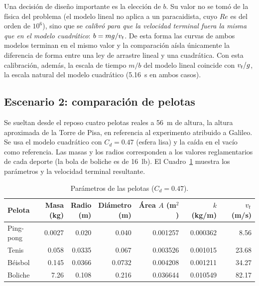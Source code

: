 Una decisión de diseño importante es la elección de $b$. Su valor no se tomó de la física del problema (el modelo lineal no aplica a un paracaidista, cuyo $Re$ es del orden de $10^6$), sino que se \emph{calibró para que la velocidad terminal fuera la misma que en el modelo cuadrático}: $b = mg/v_t$. De esta forma las curvas de ambos modelos terminan en el mismo valor y la comparación aísla únicamente la diferencia de forma entre una ley de arrastre lineal y una cuadrática. Con esta calibración, además, la escala de tiempo $m/b$ del modelo lineal coincide con $v_t/g$, la escala natural del modelo cuadrático (\qty{5.16}{s} en ambos casos).

\subsection{Escenario 2: comparación de pelotas}

Se sueltan desde el reposo cuatro pelotas reales a \qty{56}{m} de altura, la altura aproximada de la Torre de Pisa, en referencia al experimento atribuido a Galileo. Se usa el modelo cuadrático con $C_d = 0.47$ (esfera lisa) y la caída en el vacío como referencia. Las masas y los radios corresponden a los valores reglamentarios de cada deporte (la bola de boliche es de 16~lb). El Cuadro~\ref{tab:pelotas-param} muestra los parámetros y la velocidad terminal resultante.

\begin{table}[H]
  \centering
  \small
  \caption{Parámetros de las pelotas ($C_d = 0.47$).}
  \label{tab:pelotas-param}
  \begin{tabular}{@{}lrrrrrr@{}}
    \toprule
    Pelota & \thead{Masa\\(kg)} & \thead{Radio\\(m)} & \thead{Diámetro\\(m)} & \thead{Área $A$\\(m$^2$)} & \thead{$k$\\(kg/m)} & \thead{$\vt$\\(m/s)} \\
    \midrule
    Ping-pong & 0.0027 & 0.020  & 0.040  & 0.001257 & 0.000362 & 8.56 \\
    Tenis     & 0.058  & 0.0335 & 0.067  & 0.003526 & 0.001015 & 23.68 \\
    Béisbol   & 0.145  & 0.0366 & 0.0732 & 0.004208 & 0.001211 & 34.27 \\
    Boliche   & 7.26   & 0.108  & 0.216  & 0.036644 & 0.010549 & 82.17 \\
    \bottomrule
  \end{tabular}
\end{table}

